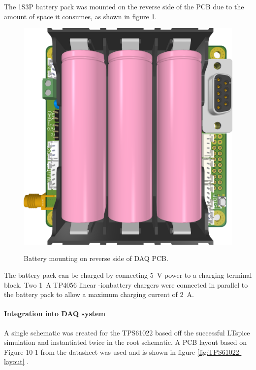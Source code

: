\documentclass[a4paper,11pt]{article}
\newcommand{\liion}{\ce{Li}-ion}
\begin{document}
The 1S3P battery pack was mounted on the reverse side of the PCB due to the amount of space it consumes, as shown in figure \ref{fig:batteries-pcb}.

\begin{figure}[H]
  \centering
  \includegraphics[width=\linewidth]{images/batteries_PCB.png}
  \label{fig:batteries-pcb}
  \caption{Battery mounting on reverse side of DAQ PCB.}
\end{figure}

The battery pack can be charged by connecting \SI{5}{\volt} power to a charging terminal block. Two \SI{1}{\ampere} TP4056 linear \liion battery chargers were connected in parallel to the battery pack to allow a maximum charging current of \SI{2}{\ampere}.

\paragraph{Integration into DAQ system}

A single schematic was created for the TPS61022 based off the successful LTspice simulation and instantiated twice in the root schematic. A PCB layout based on Figure 10-1 from the datasheet was used and is shown in figure \ref{fig:TPS61022-layout} \cite{ti2021tps61022}.
\end{document}
